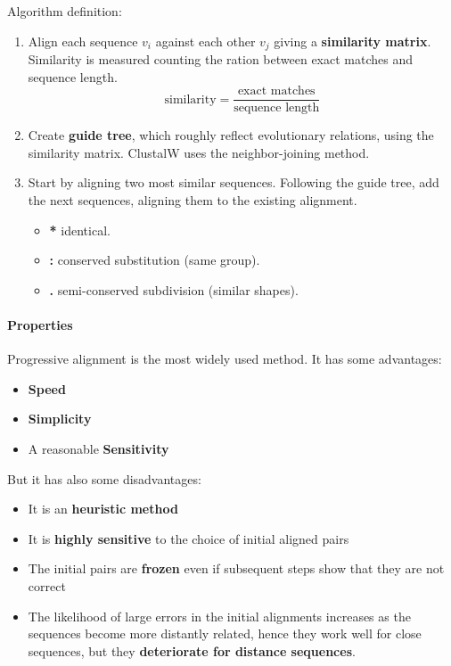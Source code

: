Algorithm definition:
\begin{enumerate}
	\item Align each sequence $v_i$ against each other $v_j$ giving a \textbf{similarity matrix}. Similarity is measured counting the ration between exact matches and sequence length. $$\text{similarity} = \frac{\text{exact matches}}{\text{sequence length}}$$ 
	
	\item Create \textbf{guide tree}, which roughly reflect evolutionary relations, using the similarity matrix. ClustalW uses the neighbor-joining method.
	
	\item Start by aligning two most similar sequences. Following the guide tree, add the next sequences, aligning them to the existing alignment.
	\begin{itemize}
		\item \textbf{*} identical.
		\item \textbf{:} conserved substitution (same group).
		\item \textbf{.} semi-conserved subdivision (similar shapes).
	\end{itemize}
\end{enumerate}

\paragraph{Properties}
Progressive alignment is the most widely used method. It has some advantages:
\begin{itemize}
	\item \textbf{Speed}
	\item \textbf{Simplicity}
	\item A reasonable \textbf{Sensitivity}
\end{itemize}
But it has also some disadvantages:
\begin{itemize}
	\item It is an \textbf{heuristic method}
	\item It is \textbf{highly sensitive} to the choice of initial aligned pairs
	\item The initial pairs are \textbf{frozen} even if subsequent steps show that they are not correct
	\item The likelihood of large errors in the initial alignments increases as the sequences become more distantly related, hence they work well for close sequences, but they \textbf{deteriorate for distance sequences}.
\end{itemize}


